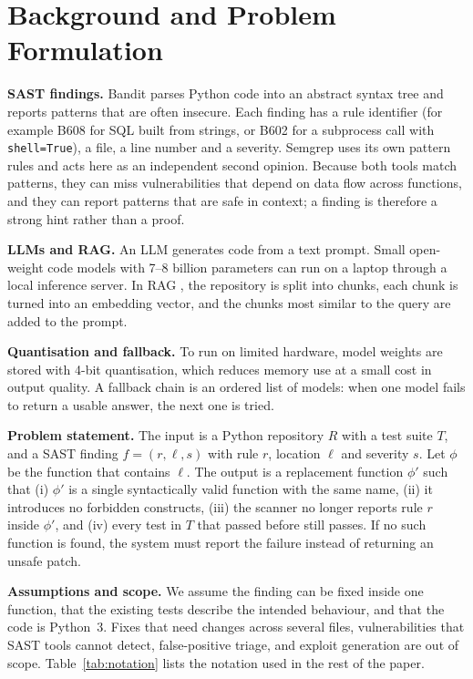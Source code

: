 \documentclass[12pt,onecolumn,draftclsnofoot]{IEEEtran}
\begin{document}
\section{Background and Problem Formulation}
\textbf{SAST findings.} Bandit \cite{bandit} parses Python code into an abstract syntax tree and reports patterns that are often insecure. Each finding has a rule identifier (for example B608 for SQL built from strings, or B602 for a subprocess call with \texttt{shell=True}), a file, a line number and a severity. Semgrep \cite{semgrep} uses its own pattern rules and acts here as an independent second opinion. Because both tools match patterns, they can miss vulnerabilities that depend on data flow across functions, and they can report patterns that are safe in context; a finding is therefore a strong hint rather than a proof.

\textbf{LLMs and RAG.} An LLM generates code from a text prompt. Small open-weight code models with 7--8 billion parameters \cite{hui2024qwen25coder, dubey2024llama3} can run on a laptop through a local inference server. In RAG \cite{lewis2020rag}, the repository is split into chunks, each chunk is turned into an embedding vector, and the chunks most similar to the query are added to the prompt.

\textbf{Quantisation and fallback.} To run on limited hardware, model weights are stored with 4-bit quantisation, which reduces memory use at a small cost in output quality. A fallback chain is an ordered list of models: when one model fails to return a usable answer, the next one is tried.

\textbf{Problem statement.} The input is a Python repository $R$ with a test suite $T$, and a SAST finding $f=(r, \ell, s)$ with rule $r$, location $\ell$ and severity $s$. Let $\phi$ be the function that contains $\ell$. The output is a replacement function $\phi'$ such that (i) $\phi'$ is a single syntactically valid function with the same name, (ii) it introduces no forbidden constructs, (iii) the scanner no longer reports rule $r$ inside $\phi'$, and (iv) every test in $T$ that passed before still passes. If no such function is found, the system must report the failure instead of returning an unsafe patch.

\textbf{Assumptions and scope.} We assume the finding can be fixed inside one function, that the existing tests describe the intended behaviour, and that the code is Python~3. Fixes that need changes across several files, vulnerabilities that SAST tools cannot detect, false-positive triage, and exploit generation are out of scope. Table~\ref{tab:notation} lists the notation used in the rest of the paper.
\end{document}
